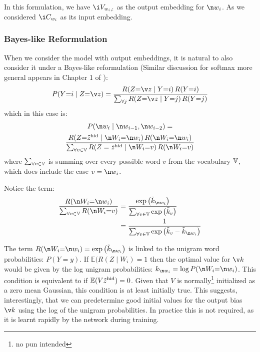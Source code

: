{In this formulation, we have $\i V_{w_{i},:}$ as the output embedding for $\n w_{i}$.
As we considered  $\i C_{w_{i}}$ as its input embedding.


\subsubsection{Bayes-like Reformulation}
When we consider the model with output embeddings, 
it is natural to also consider it under a Bayes-like reformulation (Similar discussion for softmax more general appears in Chapter 1 of \citet{NRoNL}):
\begin{multline}
P(Y{=}i\mid Z{=}\v z)=\frac{R(Z{=}\v z\mid Y{=}i)\,R(Y{=}i)}{\sum_{\forall j}R(Z{=}\v z\mid Y{=}j)\,R(Y{=}j)}
\end{multline}
which in this case is:
\begin{multline}
P(\n w_{i}\mid \n w_{i-1},\n w_{i-2})=\\
\frac{R(Z{=}\dv z_{hid} \mid \n W_{i}{=} \n w_{i})\,R(\n W_{i}{=}\n w_{i})}{
	\sum_{\forall v \in \set V}R(Z=\dv z_{hid}\mid \n W_{i} {=} v)\,R(\n W_{i}{=}v)
}
\end{multline}
where $\sum_{\forall v \in \mathbb{V}}$ is summing over every possible word $v$ from the vocabulary $\mathbb{V}$,
which does include the case $v=\n w_i$.

Notice the term:
\begin{align}
\frac{R(\n W_{i}{=}\n w_{i})}{\sum_{\forall v \in \set V} R(\n W_{i}{=}v)} 
&= \frac{\exp{\iv k_{\n w_i}}}{\sum_{\forall v \in \set V} \exp{\iv k_{v}}}\\
&= \frac{1}{\sum_{\forall v \in \set V} \exp{\iv k_{v} - \iv k_{\n w_i}}}
\end{align}


The term $R(\n W_{i}{=}\n w_i)=\exp{\iv k_{\n w_i}}$ is linked to the unigram word probabilities: $P(Y=y)$.
If $\mathbb{E}(R(Z\mid W_{i})=1$ then the optimal value for $\v k$ would be given by the log unigram probabilities: $k_{\n w_i}=\log P(\n W_{i}{=} \n w_{i})$.
This condition is equivalent to if $\mathbb{E}(V\dv z_{hid})=0$.
Given that  $V$ is normally\footnote{no pun intended} initialized as a zero mean Gaussian, this condition is at least initially true.
This suggests, interestingly, that we can predetermine good initial values for the output bias $\v k$ using the log of the unigram probabilities.
In practice this is not required, as it is learnt rapidly by the network during training.


}
